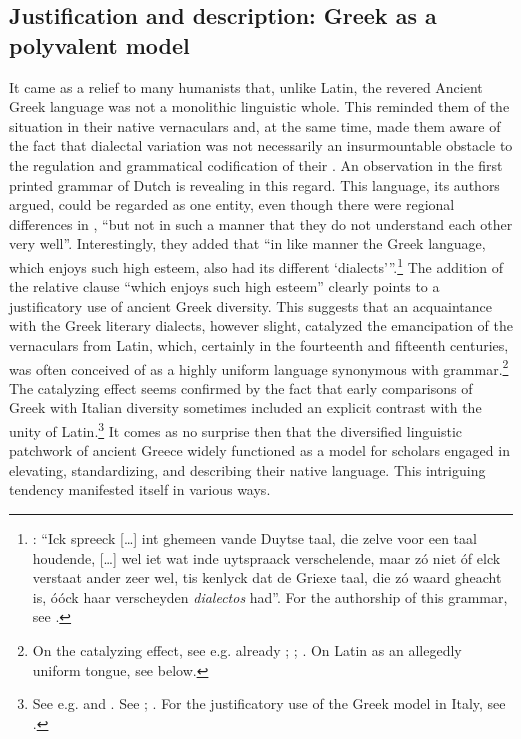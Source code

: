 \subsection{Justification and description: Greek as a polyvalent model}\label{sec:8.1.2}

It came as a relief to many humanists that, unlike Latin, the revered Ancient Greek language was not a monolithic linguistic whole. This reminded them of the situation in their native vernaculars and, at the same time, made them aware of the fact that dialectal variation was not necessarily an insurmountable obstacle to the regulation and grammatical codification of their . An observation in the first printed grammar of Dutch is revealing in this regard. This language, its authors argued, could be regarded as one entity, even though there were regional differences in , “but not in such a manner that they do not understand each other very well”. Interestingly, they added that “in like manner the Greek language, which enjoys such high esteem, also had its different ‘dialects’”.\footnote{\citet[110]{[spieghel]1584}: “Ick spreeck […] int ghemeen vande Duytse taal, die zelve voor een taal houdende, […] wel iet wat inde uytspraack verschelende, maar zó niet óf elck verstaat ander zeer wel, tis kenlyck dat de Griexe taal, die zó waard gheacht is, óóck haar verscheyden \textit{dialectos} had”. For the authorship of this grammar, see \citet{Peeters1982}.} The addition of the relative clause “which enjoys such high esteem” clearly points to a justificatory use of ancient Greek diversity. This suggests that an acquaintance with the Greek literary dialects, however slight, catalyzed the emancipation of the vernaculars from Latin, which, certainly in the fourteenth and fifteenth centuries, was often conceived of as a highly uniform language synonymous with grammar.\footnote{On the catalyzing effect, see e.g. already \citet[688]{Bonfante1953}; \citet[9]{Trapp1990}; \citet[67]{Rhodes2015}. On Latin as an allegedly uniform tongue, see  below.} The catalyzing effect seems confirmed by the fact that early comparisons of Greek with Italian diversity sometimes included an explicit contrast with the unity of Latin.\footnote{See e.g. \citet[\textsc{ii}.41]{Landino1974} and \citet[*.ii\textsc{\textsuperscript{v}}]{Manutius1496Aldus}. See \citet[172--173]{Alinei1984}; \citet[209--210, 215]{Trovato1984}. For the justificatory use of the Greek model in Italy, see \citet[46, 50]{Tavoni1998}.} It comes as no surprise then that the diversified linguistic patchwork of ancient Greece widely functioned as a model for scholars engaged in elevating, standardizing, and describing their native  language. This intriguing tendency manifested itself in various ways.

